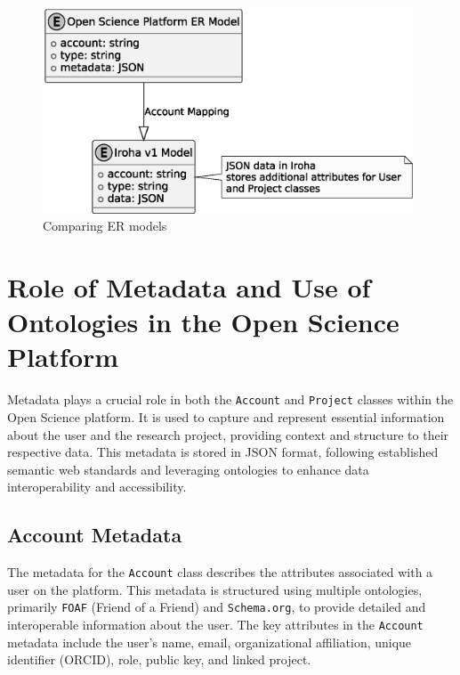 \documentclass{article}
\begin{document}
\begin{figure}[htbp]
      \centering
      \includegraphics[width=0.98\textwidth, keepaspectratio]{comparing_er_models.eps}
      \caption{Comparing ER models}
      \label{fig:comparing_er_models}
\end{figure}


\section{Role of Metadata and Use of Ontologies in the Open Science Platform}

Metadata plays a crucial role in both the \texttt{Account} and \texttt{Project} classes within the Open Science platform. It is used to capture and represent essential information about the user and the research project, providing context and structure to their respective data. This metadata is stored in JSON format, following established semantic web standards and leveraging ontologies to enhance data interoperability and accessibility.

\subsection{Account Metadata}
The metadata for the \texttt{Account} class describes the attributes associated with a user on the platform. This metadata is structured using multiple ontologies, primarily \texttt{FOAF} (Friend of a Friend) and \texttt{Schema.org}, to provide detailed and interoperable information about the user. The key attributes in the \texttt{Account} metadata include the user's name, email, organizational affiliation, unique identifier (ORCID), role, public key, and linked project.
\end{document}
